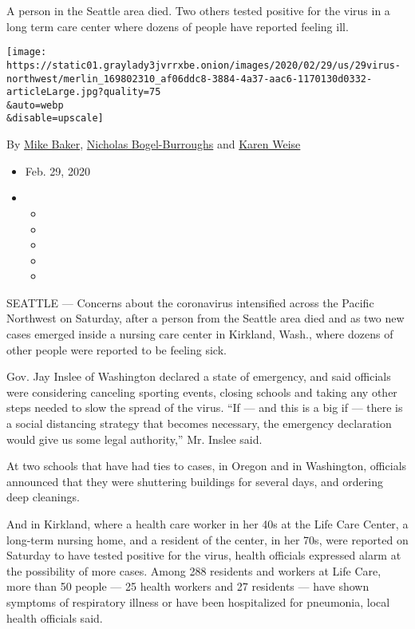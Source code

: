 A person in the Seattle area died. Two others tested positive for the
virus in a long term care center where dozens of people have reported
feeling ill.

\texttt{[image: https://static01.graylady3jvrrxbe.onion/images/2020/02/29/us/29virus-northwest/merlin\_169802310\_af06ddc8-3884-4a37-aac6-1170130d0332-articleLarge.jpg?quality=75\\\&auto=webp\\\&disable=upscale]}

By \href{https://www.nytimes3xbfgragh.onion/by/mike-baker}{Mike Baker},
\href{https://www.nytimes3xbfgragh.onion/by/nicholas-bogel-burroughs}{Nicholas
Bogel-Burroughs} and
\href{https://www.nytimes3xbfgragh.onion/by/karen-weise}{Karen Weise}

\begin{itemize}
\item
  Feb. 29, 2020
\item
  \begin{itemize}
  \item
  \item
  \item
  \item
  \item
  \end{itemize}
\end{itemize}

SEATTLE --- Concerns about the coronavirus intensified across the
Pacific Northwest on Saturday, after a person from the Seattle area died
and as two new cases emerged inside a nursing care center in Kirkland,
Wash., where dozens of other people were reported to be feeling sick.

Gov. Jay Inslee of Washington declared a state of emergency, and said
officials were considering canceling sporting events, closing schools
and taking any other steps needed to slow the spread of the virus. ``If
--- and this is a big if --- there is a social distancing strategy that
becomes necessary, the emergency declaration would give us some legal
authority,'' Mr. Inslee said.

At two schools that have had ties to cases, in Oregon and in Washington,
officials announced that they were shuttering buildings for several
days, and ordering deep cleanings.

And in Kirkland, where a health care worker in her 40s at the Life Care
Center, a long-term nursing home, and a resident of the center, in her
70s, were reported on Saturday to have tested positive for the virus,
health officials expressed alarm at the possibility of more cases. Among
288 residents and workers at Life Care, more than 50 people --- 25
health workers and 27 residents --- have shown symptoms of respiratory
illness or have been hospitalized for pneumonia, local health officials
said.

